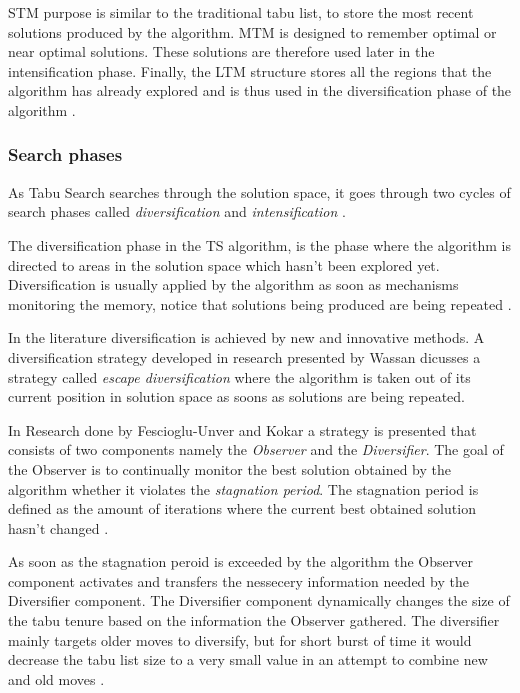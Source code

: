 STM purpose is similar to the traditional tabu list, to store the most recent solutions produced by the algorithm. MTM is designed to remember optimal or near optimal solutions. These solutions are therefore used later in the intensification phase. Finally, the LTM structure stores all the regions that the algorithm has already explored and is thus used in the diversification phase of the algorithm \cite{MultiObjTabu}.

\subsubsection{Search phases}
As Tabu Search searches through the solution space, it goes through two cycles of search phases called \emph{diversification} and \emph{intensification} \cite{TabuParameterization,TabuCrewSchedulingProblem,NonlinearGlobalTabu,SelfControllingReactiveTabu}.

The diversification phase in the TS algorithm, is the phase where the algorithm is directed to areas in the solution space which hasn't been explored yet. Diversification is usually applied by the algorithm as soon as mechanisms monitoring the memory, notice that solutions being produced are being repeated \cite{ReactiveTabuVHR,SelfControllingReactiveTabu}. 

In the literature diversification is achieved by new and innovative methods. A diversification strategy developed in research presented by Wassan \cite{ReactiveTabuVHR} dicusses a strategy called \emph{escape diversification} where the algorithm is taken out of its current position in solution space as soons as solutions are being repeated. 

In Research done by Fescioglu-Unver and Kokar \cite{SelfControllingReactiveTabu} a strategy is presented that consists of two components namely the \emph{Observer} and the \emph{Diversifier}. The goal of the Observer is to continually monitor the best solution obtained by the algorithm whether it violates the \emph{stagnation period}. The stagnation period is defined as the amount of iterations where the current best obtained solution hasn't changed \cite{SelfControllingReactiveTabu}. 

As soon as the stagnation peroid is exceeded by the algorithm the Observer component activates and transfers the nessecery information needed by the Diversifier component. The Diversifier component dynamically changes the size of the tabu tenure based on the information the Observer gathered. The diversifier mainly targets older moves to diversify, but for short burst of time it would decrease the tabu list size to a very small value in an attempt to combine new and old moves \cite{SelfControllingReactiveTabu}.

